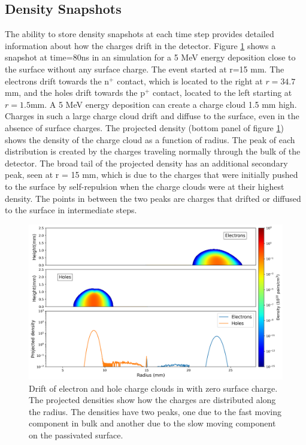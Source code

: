 \subsection{Density Snapshots}
The ability to store density snapshots at each time step provides detailed information about how the charges drift in the detector. Figure \ref{ch3_fig_ehd_path_pd_sc_0} shows a snapshot at time=$80$ns in an {\ehd} simulation for a 5 MeV energy deposition close to the surface without any surface charge. The event started at r=15 mm. The electrons drift towards the n$^+$ contact, which is located to the right at $r=34.7$mm, and the holes drift towards the p$^+$ contact, located to the left starting at $r=1.5$mm. A 5 MeV energy deposition can create a charge cloud 1.5 mm high. Charges in such a large charge cloud drift and diffuse to the surface, even in the absence of surface charges. The projected density (bottom panel of figure \ref{ch3_fig_ehd_path_pd_sc_0}) shows the density of the charge cloud as a function of radius. The peak of each distribution is created by the charges traveling normally through the bulk of the detector. The broad tail of the projected density has an additional secondary peak, seen at r = 15 mm, which is due to the charges that were initially pushed to the surface by self-repulsion when the charge clouds were at their highest density. The points in between the two peaks are charges that drifted or diffused to the surface in intermediate steps. 

\begin{figure}%
    \includegraphics[trim={0cm 0 0cm 0},clip,width=0.99\linewidth]{ch3/figs/drift_path_sc=0.0.png}
    \caption{Drift of electron and hole charge clouds in {\ehd} with zero surface charge. The projected densities show how the charges are distributed along the radius. The densities have two peaks, one due to the fast moving component in bulk and another due to the slow moving component on the passivated surface.}
    \label{ch3_fig_ehd_path_pd_sc_0}
\end{figure}

